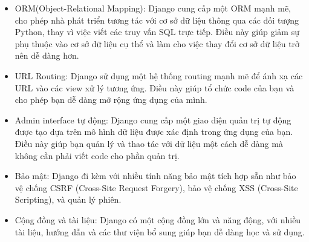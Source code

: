 \documentclass[a4paper]{article}
\begin{document}
\begin{itemize}
    \item ORM(Object-Relational Mapping): Django cung cấp một ORM mạnh mẽ, cho phép nhà phát triển tương tác với cơ sở dữ liệu thông qua các đối tượng Python, thay vì việc viết các truy vấn SQL trực tiếp. Điều này giúp giảm sự phụ thuộc vào cơ sở dữ liệu cụ thể và làm cho việc thay đổi cơ sở dữ liệu trở nên dễ dàng hơn.
    \item URL Routing: Django sử dụng một hệ thống routing mạnh mẽ để ánh xạ các URL vào các view xử lý tương ứng. Điều này giúp tổ chức code của bạn và cho phép bạn dễ dàng mở rộng ứng dụng của mình.
    \item Admin interface tự động: Django cung cấp một giao diện quản trị tự động được tạo dựa trên mô hình dữ liệu được xác định trong ứng dụng của bạn. Điều này giúp bạn quản lý và thao tác với dữ liệu một cách dễ dàng mà không cần phải viết code cho phần quản trị.
    \item Bảo mật: Django đi kèm với nhiều tính năng bảo mật tích hợp sẵn như bảo vệ chống CSRF (Cross-Site Request Forgery), bảo vệ chống XSS (Cross-Site Scripting), và quản lý phiên.
    \item Cộng đồng và tài liệu: Django có một cộng đồng lớn và năng động, với nhiều tài liệu, hướng dẫn và các thư viện bổ sung giúp bạn dễ dàng học và sử dụng.
    
\end{itemize}
\end{document}

